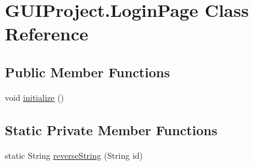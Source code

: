 \hypertarget{class_g_u_i_project_1_1_login_page}{}\section{G\+U\+I\+Project.\+Login\+Page Class Reference}
\label{class_g_u_i_project_1_1_login_page}
\subsection*{Public Member Functions}
\begin{DoxyCompactItemize}
\item 
void \mbox{\hyperlink{class_g_u_i_project_1_1_login_page_a63b7bf0ce6debc9802d085a742f4a424}{initialize}} ()
\end{DoxyCompactItemize}
\subsection*{Static Private Member Functions}
\begin{DoxyCompactItemize}
\item 
static String \mbox{\hyperlink{class_g_u_i_project_1_1_login_page_a97f648655f6545494a758847c65b49a0}{reverse\+String}} (String id)
\end{DoxyCompactItemize}
